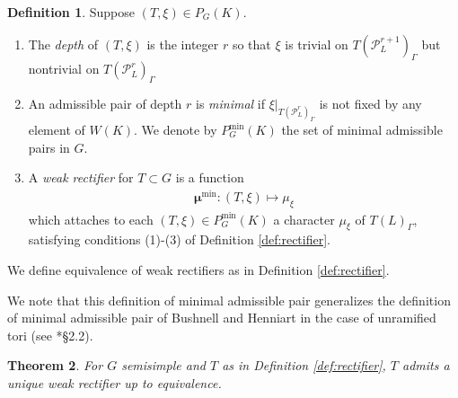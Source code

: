 \documentclass{compositio}
\theoremstyle{plain}
\newtheorem{theorem}{Theorem}[section]
\theoremstyle{definition}
\newtheorem{definition}[theorem]{Definition}
\numberwithin{equation}{section}
\newcommand{\PL}{\mathcal{P}_L}
\newcommand{\Pmin}{P_G^{\min}}
\newcommand{\bmu}{\boldsymbol\mu}
\newcommand{\mumin}{\bmu^{\min}}
\begin{document}
\begin{definition}\label{def:general_pair}
Suppose $(T, \xi) \in P_G(K)$.
\begin{enumerate}
\item The \emph{depth} of $(T, \xi)$ is the integer $r$ so that $\xi$
is trivial on $T(\PL^{r+1})_{\Gamma}$ but nontrivial on
$T(\PL^{r})_{\Gamma}$
\item An admissible pair of depth $r$ is \emph{minimal}
if $\xi|_{T(\PL^{r})_{\Gamma}}$
is not fixed by any element of $W(K)$.
We denote by $\Pmin(K)$ the set
of minimal admissible pairs in $G$.
\item A \emph{weak rectifier} for $T \subset G$ is a function
\begin{align*}
\mumin : (T, \xi) \mapsto \mu_{\xi}
\end{align*}
which attaches to each $(T, \xi) \in \Pmin(K)$ a character
  $\mu_{\xi}$ of $T(L)_{\Gamma}$, satisfying conditions (1)-(3)
  of Definition \ref{def:rectifier}.
\end{enumerate}
We define equivalence of weak rectifiers as in Definition \ref{def:rectifier}.
\end{definition}

We note that this definition of minimal admissible pair generalizes
the definition of minimal admissible pair of Bushnell and Henniart in
the case of unramified tori (see \cite{bushnell-henniart:05a}*{\S2.2}).

\begin{theorem} \label{thm:unique_semisimple}
For $G$ semisimple and $T$ as in Definition \ref{def:rectifier}, $T$ admits a unique weak rectifier up to equivalence.
\end{theorem}
\end{document}
